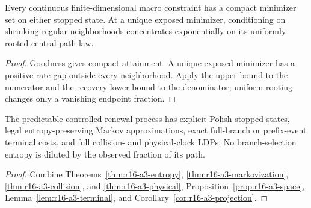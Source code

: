 \begin{corollary}
\label{cor:r16-a3-projection}
Every continuous finite-dimensional macro constraint has a compact minimizer
set on either stopped state.  At a unique exposed minimizer, conditioning on
shrinking regular neighborhoods concentrates exponentially on its uniformly
rooted central path law.
\end{corollary}

\begin{proof}
Goodness gives compact attainment.  A unique exposed minimizer has a positive
rate gap outside every neighborhood.  Apply the upper bound to the numerator
and the recovery lower bound to the denominator; uniform rooting changes only
a vanishing endpoint fraction.
\end{proof}

\begin{theorem}
\label{thm:r16-a3-main}
The predictable controlled renewal process has explicit Polish stopped states,
legal entropy-preserving Markov approximations, exact full-branch or
prefix-event terminal costs, and full collision- and physical-clock LDPs.  No
branch-selection entropy is diluted by the observed fraction of its path.
\end{theorem}

\begin{proof}
Combine Theorems~\ref{thm:r16-a3-entropy},
\ref{thm:r16-a3-markovization}, \ref{thm:r16-a3-collision}, and
\ref{thm:r16-a3-physical}, Proposition~\ref{prop:r16-a3-space},
Lemma~\ref{lem:r16-a3-terminal}, and
Corollary~\ref{cor:r16-a3-projection}.
\end{proof}
